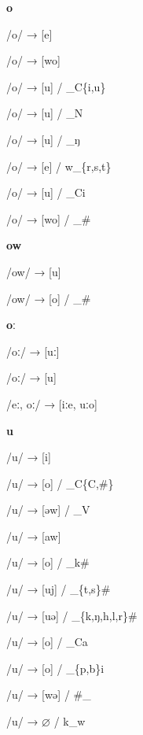 \begin{center}\textbf{o}\end{center}
\begin{multicols}{4}
\noindent /o/ → [e]

\noindent /o/ → [wo]

\noindent /o/ → [u] / \_C\{i,u\}

\noindent /o/ → [u] / \_N

\noindent /o/ → [u] / \_ŋ

\noindent /o/ → [e] / w\_\{r,s,t\}

\noindent /o/ → [u] / \_Ci

\noindent /o/ → [wo] / \_\#

\end{multicols}

\begin{center}\textbf{ow}\end{center}
\begin{multicols}{4}
\noindent /ow/ → [u]

\noindent /ow/ → [o] / \_\#

\end{multicols}

\begin{center}\textbf{oː}\end{center}
\begin{multicols}{4}
\noindent /oː/ → [uː]

\noindent /oː/ → [u]

\noindent /eː, oː/ → [iːe, uːo]
\end{multicols}

\begin{center}\textbf{u}\end{center}
\begin{multicols}{4}
\noindent /u/ → [i]

\noindent /u/ → [o] / \_C\{C,\#\}

\noindent /u/ → [əw] / \_V

\noindent /u/ → [aw]

\noindent /u/ → [o] / \_k\#

\noindent /u/ → [uj] / \_\{t,s\}\#

\noindent /u/ → [uə] / \_\{k,ŋ,h,l,r\}\#

\noindent /u/ → [o] / \_Ca

\noindent /u/ → [o] / \_\{p,b\}i

\noindent /u/ → [wə] / \#\_

\noindent /u/ → $\varnothing$ / k\_w
\end{multicols}

